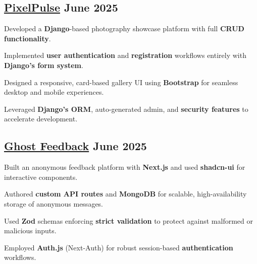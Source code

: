 \subsection{{\href{https://www.linkedin.com/posts/thepratikguptaa_django-webdevelopment-photography-activity-7343983053574160385-7ice?utm_source=share&utm_medium=member_desktop&rcm=ACoAAFNTblUBnfiK5ntkG3s1-NXJ0TPqdRrZrz0}{PixelPulse} \hfill June 2025}}
\begin{zitemize}
\item Developed a \textbf{Django}-based photography showcase platform with full \textbf{CRUD functionality}.
\item Implemented \textbf{user authentication} and \textbf{registration} workflows entirely with \textbf{Django’s form system}.
\item Designed a responsive, card-based gallery UI using \textbf{Bootstrap} for seamless desktop and mobile experiences.
\item Leveraged \textbf{Django’s ORM}, auto-generated admin, and \textbf{security features} to accelerate development.
\end{zitemize}

\subsection{{\href{https://ghostfeedback.vercel.app/u/Pratik}{Ghost Feedback} \hfill June 2025}}
\begin{zitemize}
\item Built an anonymous feedback platform with \textbf{Next.js} and used \textbf{shadcn-ui} for interactive components.
\item Authored \textbf{custom API routes} and \textbf{MongoDB} for scalable, high-availability storage of anonymous messages.
\item Used \textbf{Zod} schemas enforcing \textbf{strict validation} to protect against malformed or malicious inputs.
\item Employed \textbf{Auth.js} (Next-Auth) for robust session-based \textbf{authentication} workflows.
\end{zitemize}

